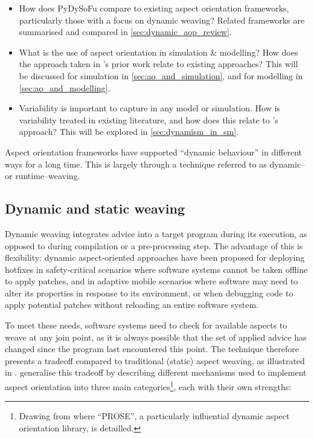\begin{itemize}
    \item How does PyDySoFu compare to existing aspect orientation frameworks,
    particularly those with a focus on dynamic weaving? Related frameworks are
    summarised and compared in \cref{sec:dynamic_aop_review}.

    \item What is the use of aspect orientation in simulation \& modelling? How
    does the approach taken in \pdsf's prior work relate to existing
    approaches? This will be discussed for simulation in
    \cref{sec:ao_and_simulation}, and for modelling in
    \cref{sec:ao_and_modelling}.
    
    \item Variability is important to capture in any \sociotechnical model or
    simulation. How is variability treated in existing literature, and how does
    this relate to \pdsf's approach? This will be explored in
    \cref{sec:dynamism_in_sm}.
\end{itemize}





Aspect orientation frameworks have supported ``dynamic behaviour'' in different
ways for a long time. This is largely through a technique referred to as dynamic–
or runtime–weaving.

\subsection{Dynamic and static weaving}

Dynamic weaving integrates advice into a target program during its execution, as
opposed to during compilation or a pre-processing step. The advantage of this is
flexibility: dynamic aspect-oriented approaches have been proposed for deploying
hotfixes in safety-critical scenarios where software systems cannot be taken
offline to apply patches, and in adaptive mobile scenarios where software
may need to alter its properties in response to its
environment\cite{hveding2005aspect}, or when debugging code to apply potential
patches without reloading an entire software system\cite{popovici2002PROSE}.

To meet these needs, software systems need to check for available aspects to
weave at any join point, as it is always possible that the set of applied advice
has changed since the program last encountered this point. The technique
therefore presents a tradeoff compared to traditional (static) aspect weaving,
as illustrated in \cite{dynamicAOchitchyan}. \citeauthor{dynamicAOchitchyan}
generalise this tradeoff by describing different mechanisms used to implement
aspect orientation into three main categories\footnote{Drawing from
\cite{popovici2002PROSE,popovici2003JITaspects} where ``PROSE'', a particularly
influential dynamic aspect orientation library, is detailled.}, each with their own
strengths:

